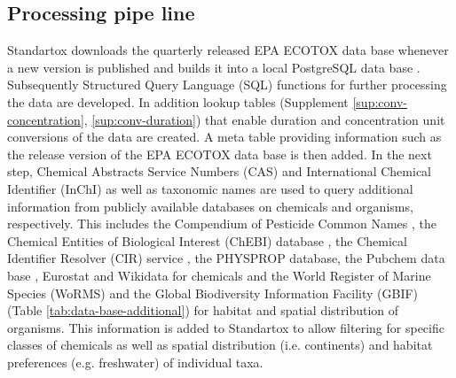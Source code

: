 \subsection{Processing pipe line}
Standartox downloads the quarterly released EPA ECOTOX data base whenever a new version is published and builds it into a local PostgreSQL data base \citep{szocs_build_2019}. Subsequently Structured Query Language (SQL) functions for further processing the data are developed. In addition lookup tables (Supplement \ref{sup:conv-concentration}, \ref{sup:conv-duration}) that enable duration and concentration unit conversions of the data are created. A meta table providing information such as the release version of the EPA ECOTOX data base is then added. In the next step, Chemical Abstracts Service Numbers (CAS) and International Chemical Identifier (InChI) as well as taxonomic names are used to query additional information from publicly available databases on chemicals and organisms, respectively. This includes the Compendium of Pesticide Common Names \citep{wood_compendium_2019}, the Chemical Entities of Biological Interest (ChEBI) database \citep{hastings_chebi_2016}, the Chemical Identifier Resolver (CIR) service \citep{nationalinstitutesofhealthnih_chemical_2019}, the PHYSPROP database, the Pubchem data base \citep{kim_pubchem_2016}, Eurostat \citep{europeancommission_eurostat_2019} and Wikidata \citep{vrandecic_wikidata_2014} for chemicals and the World Register of Marine Species (WoRMS) \citep{wormseditorialboard_world_2018} and the Global Biodiversity Information Facility (GBIF) \citep{_gbif_2019} (Table \ref{tab:data-base-additional}) for habitat and spatial distribution of organisms. This information is added to Standartox to allow filtering for specific classes of chemicals as well as spatial distribution (i.e. continents) and habitat preferences (e.g. freshwater) of individual taxa.



